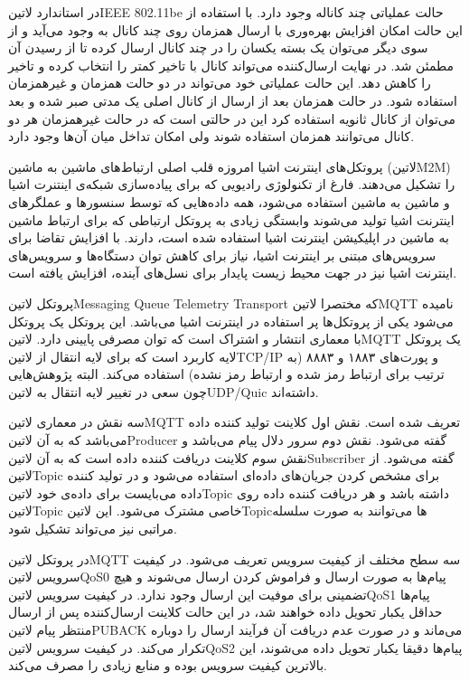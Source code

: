 در استاندارد ‌لاتین{IEEE 802.11be} حالت عملیاتی چند کاناله وجود دارد. با استفاده از این حالت امکان افزایش بهره‌وری با ارسال همزمان
روی چند کانال به وجود می‌آید و از سوی دیگر می‌توان یک بسته یکسان را در چند کانال ارسال کرده تا از رسیدن آن مطمئن شد. در نهایت ارسال‌کننده
می‌تواند کانال با تاخیر کمتر را انتخاب کرده و تاخیر را کاهش دهد. این حالت عملیاتی خود می‌تواند در دو حالت همزمان و غیرهمزمان استفاده شود.
در حالت همزمان بعد از ارسال از کانال اصلی یک مدتی صبر شده و بعد می‌توان از کانال ثانویه استفاده کرد این در حالتی است که در حالت غیرهمزمان
هر دو کانال می‌توانند همزمان استفاده شوند ولی امکان تداخل میان آن‌ها وجود دارد.



پروتکل‌های اینترنت اشیا امروزه قلب اصلی ارتباط‌های ماشین به ماشین (‌لاتین{M2M}) را تشکیل می‌دهند. فارغ از تکنولوژی رادیویی که برای پیاده‌سازی شبکه‌ی اینتنرت اشیا و ماشین به ماشین استفاده می‌شود، همه داده‌هایی که توسط سنسورها و عملگرهای اینترنت اشیا
تولید می‌شوند وابستگی زیادی به پروتکل ارتباطی که برای ارتباط ماشین به ماشین در اپلیکیشن اینترنت اشیا استفاده شده است، دارند.
با افزایش تقاضا برای سرویس‌های مبتنی بر اینترنت اشیا، نیاز برای کاهش توان دستگاه‌ها و سرویس‌های اینترنت اشیا نیز در جهت محیط زیست پایدار برای نسل‌های آینده، افزایش یافته است.

پروتکل ‌لاتین{Messaging Queue Telemetry Transport} که مختصرا ‌لاتین{MQTT} نامیده می‌شود یکی از پروتکل‌ها پر استفاده در اینترنت اشیا می‌باشد.
این پروتکل یک پروتکل با معماری انتشار و اشتراک است که توان مصرفی پایینی دارد.
‌لاتین{MQTT} یک پروتکل لایه کاربرد است که برای لایه انتقال از ‌لاتین{TCP/IP} و پورت‌های ۱۸۸۳ و ۸۸۸۳ (به ترتیب برای ارتباط رمز شده و ارتباط رمز نشده) استفاده می‌کند. البته پژوهش‌هایی چون  سعی در تغییر لایه انتقال به ‌لاتین{UDP/Quic} داشته‌اند.

سه نقش در معماری ‌لاتین{MQTT} تعریف شده است. نقش اول کلاینت تولید کننده داده می‌باشد که به آن ‌لاتین{Producer} گفته می‌شود. نقش دوم سرور دلال پیام می‌باشد و نقش سوم کلاینت دریافت کننده داده است که به آن ‌لاتین{Subscriber} گفته می‌شود.
از ‌لاتین{Topic} برای مشخص کردن جریان‌های داده‌ای استفاده می‌شود و در تولید کننده داده می‌بایست برای داده‌ی خود ‌لاتین{Topic} داشته باشد و هر دریافت کننده داده روی ‌لاتین{Topic} خاصی مشترک می‌شود.
این ‌لاتین{Topic}ها می‌توانند به صورت سلسله مراتبی نیز می‌تواند تشکیل شود.

در پروتکل ‌لاتین{‌MQTT} سه سطح مختلف از کیفیت سرویس تعریف می‌شود. در کیفیت سرویس ‌لاتین{QoS0} پیام‌ها به صورت ارسال و فراموش کردن ارسال می‌شوند و هیچ تضمینی برای موفیت این ارسال وجود ندارد.
در کیفیت سرویس ‌لاتین{QoS1} پیام‌ها حداقل یکبار تحویل داده خواهند شد، در این حالت کلاینت ارسال‌کننده پس از ارسال منتظر پیام ‌لاتین{PUBACK} می‌ماند و در صورت عدم دریافت آن فرآیند ارسال را دوباره تکرار می‌کند.
در کیفیت سرویس ‌لاتین{QoS2} پیام‌ها دقیقا یکبار تحویل داده می‌شوند، این بالاترین کیفیت سرویس بوده و منابع زیادی را مصرف می‌کند.


